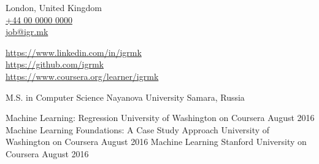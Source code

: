 \documentclass[9pt,a4paper]{juicv}
\newcommand{\myphone}{\href{tel:+440000000000}{+44 00 0000 0000}}
\begin{document}
\begin{paracol}{2}
\newpage
\switchcolumn

    London, United Kingdom\\
    \myphone\\
    \href{mailto:job@igr.mk}{job@igr.mk}

    \vspace{6pt}
    {
        \small
        \href{https://www.linkedin.com/in/igrmk}{https://www.linkedin.com/in/igrmk}\\
        \href{https://github.com/igrmk}{https://github.com/igrmk}\\
        \href{https://www.coursera.org/learner/igrmk}{https://www.coursera.org/learner/igrmk}
        \par
    }


    \vspace{6pt}
    {
        \raggedright
        \cvTag{\LaTeX}
    }

    \cvRightEventNoBody
        {M.S. in Computer Science}
        {Nayanova University}
        {}
        {Samara, Russia}

    \cvRightEventNoBody
        {Machine Learning: Regression}
        {University of Washington on Coursera}
        {August 2016}
        {}
    \cvRightEventNoBody
        {Machine Learning Foundations: A Case Study Approach}
        {University of Washington on Coursera}
        {August 2016}
        {}
    \cvRightEventNoBody
        {Machine Learning}
        {Stanford University on Coursera}
        {August 2016}
        {}

\end{paracol}
\end{document}
